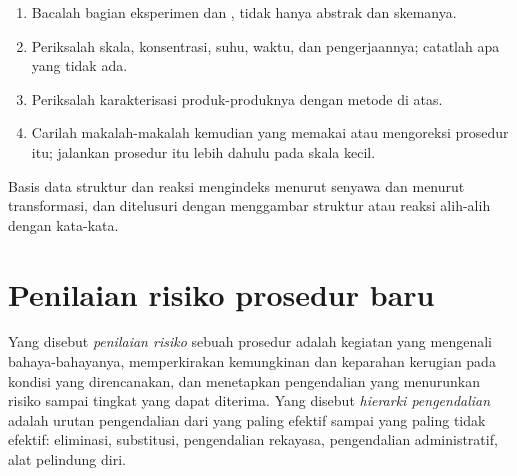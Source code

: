 \begin{method}\label{met:b3:lab-techniques-3:read-paper}
\begin{enumerate}
  \item Bacalah bagian eksperimen dan , tidak hanya
        abstrak dan skemanya.
  \item Periksalah skala, konsentrasi, suhu, waktu, dan pengerjaannya; catatlah
        apa yang tidak ada.
  \item Periksalah karakterisasi produk-produknya dengan metode di atas.
  \item Carilah makalah-makalah kemudian yang memakai atau mengoreksi prosedur itu; jalankan prosedur itu lebih dahulu pada
        skala kecil.
\end{enumerate}
\end{method}

Basis data struktur dan reaksi mengindeks  menurut senyawa dan
menurut transformasi, dan ditelusuri dengan menggambar struktur atau reaksi
alih-alih dengan kata-kata.

\section{Penilaian risiko prosedur baru}

\begin{definition}\label{def:b3:lab-techniques-3:assessment}
Yang disebut \emph{penilaian risiko} sebuah prosedur adalah kegiatan yang mengenali
bahaya-bahayanya, memperkirakan kemungkinan dan keparahan kerugian pada kondisi yang direncanakan,
dan menetapkan pengendalian yang menurunkan risiko sampai tingkat yang dapat diterima. Yang disebut
\emph{hierarki pengendalian} adalah urutan pengendalian dari yang paling efektif sampai
yang paling tidak efektif: eliminasi, substitusi, pengendalian rekayasa,
pengendalian administratif, alat pelindung diri.
\end{definition}

